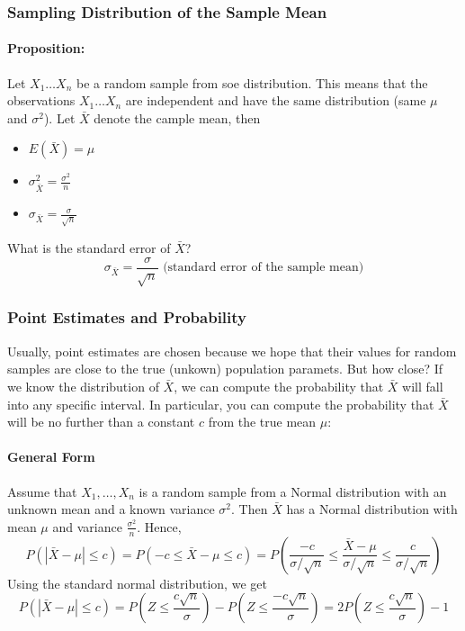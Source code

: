 \subsubsection*{Sampling Distribution of the Sample Mean}
\paragraph*{Proposition:}
Let $X_1 \dots X_n$ be a random sample from soe distribution. This means that the observations $X_1 \dots X_n$ are independent and have the same distribution (same $\mu$ and $\sigma^2$). Let $\bar{X}$ denote the cample mean, then

\begin{itemize}
		\item $E(\bar{X}) = \mu$
		\item $\sigma^2_{\bar{X}} = \frac{\sigma^2}{n}$
		\item $\sigma_{\bar{X}} = \frac{\sigma}{\sqrt{n}}$
\end{itemize}

What is the standard error of $\bar{X}$?
\[\sigma_{\bar{X}} = \frac{\sigma}{\sqrt{n}} \text{ (standard error of the sample mean)}\]

\subsubsection*{Point Estimates and Probability}
Usually, point estimates are chosen because we hope that their values for random samples are close to the 
true (unkown) population paramets. But how close? If we know the distribution of $\bar{X}$,
we can compute the probability that $\bar{X}$ will fall into any specific interval.
In particular, you can compute the probability that $\bar{X}$ will be no further than a constant $c$
from the true mean $\mu$:

\paragraph*{General Form}
Assume that $X_1, \dots, X_n$ is a random sample from a Normal distribution with an unknown mean and
a known variance $\sigma^2$. Then $\bar{X}$ has a Normal distribution with mean $\mu$ and variance $\frac{\sigma^2}{n}$.
Hence,
\[P(|\bar{X} - \mu| \leq c) = P\left(-c \leq \bar{X} - \mu \leq c\right) = P\left(\frac{-c}{\sigma / \sqrt{n}} \leq \frac{\bar{X} - \mu}{\sigma / \sqrt{n}} \leq \frac{c}{\sigma / \sqrt{n}}\right)\]
Using the standard normal distribution, we get
\[P(|\bar{X} - \mu| \leq c) = P\left(Z \leq \frac{c \sqrt{n}}{\sigma}\right) - P\left(Z \leq \frac{-c \sqrt{n}}{\sigma}\right) = 2 P\left(Z \leq \frac{c \sqrt{n}}{\sigma}\right) - 1\]